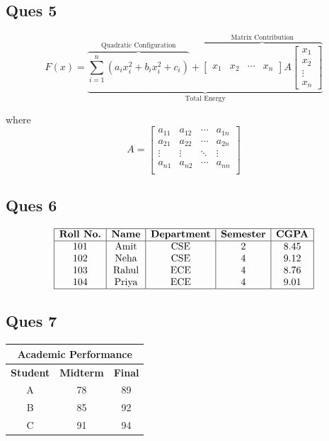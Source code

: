 \documentclass{article}
\begin{document}
\subsection{\textbf{Ques 5}}
\[
F(x)= 
\underbrace{
\overbrace{
\sum_{i=1}^{n}
\left(a_i x_i^2+b_i x_i^2+c_i\right)}^{\text{Quadratic Configuration}}
+
\overbrace{
\begin{bmatrix}
x_1 & x_2 & \cdots & x_n
\end{bmatrix}
A
\begin{bmatrix}
x_1\\
x_2\\
\vdots\\
x_n
\end{bmatrix}
}^{\text{Matrix Contribution}}
}_{\text{Total Energy}}
\]

where
\[
A=
 \begin{bmatrix}
 a_{11} & a_{12} & \cdots & a_{1n}\\
 a_{21} & a_{22} & \cdots & a_{2n}\\
 \vdots & \vdots & \ddots & \vdots\\
 a_{n1} & a_{n2} & \cdots & a_{nn}\\
 \end{bmatrix}
 \]
 


 \subsection{\textbf{Ques 6}}
 \[
 \begin{array}{|c|c|c|c|c|}
 \hline
 \textbf{Roll No.} & \textbf{Name} & 
 \textbf{Department} & \textbf{Semester} & \textbf{CGPA}
 \\
 \hline
 101 & \text{Amit} & \text{CSE} & 2 & 8.45 \\
 102 & \text{Neha} & \text{CSE} & 4 & 9.12 \\
 103 & \text{Rahul} & \text{ECE} & 4 & 8.76 \\
 104 & \text{Priya} & \text{ECE} & 4 & 9.01 \\
 \hline
 \end{array}
 \]


 \subsection{\textbf{Ques 7}}
 \begin{table}[h]
 \centering
 \begin{tabular}{|c|c|c|}
 \hline
 \multicolumn{3}{|c|}{\textbf{Academic Performance}} \\ \hline
 \textbf{Student} & \textbf{Midterm} & \textbf{Final} \\ \hline
 A & 78 & 89 \\
 B & 85 & 92 \\ 
 C & 91 & 94 \\
 \hline
 \end{tabular}
 \end{table}
\end{document}
